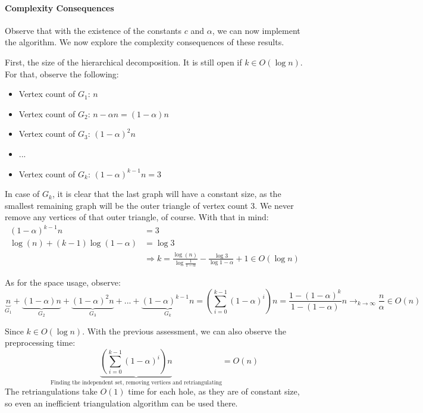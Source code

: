 \documentclass[10pt,fleqn]{article}
\theoremstyle{definition}
\theoremstyle{remark}
\begin{document}
\paragraph{Complexity Consequences}

Observe that with the existence of the constants \(c\) and \(\alpha\), we can now implement the algorithm. We now explore the complexity consequences of these results.

First, the size of the hierarchical decomposition. It is still open if \(k \in O(\log{n})\). For that, observe the following:
\begin{itemize}
    \item Vertex count of \(G_1\): \(n\)
    \item Vertex count of \(G_2\): \(n - \alpha n = (1-\alpha) n\)
    \item Vertex count of \(G_3\): \((1-\alpha)^2 n\)
    \item ...
    \item Vertex count of \(G_k\): \((1-\alpha)^{k-1} n = 3\)
\end{itemize}
In case of \(G_k\), it is clear that the last graph will have a constant size, as the smallest remaining graph will be the outer triangle of vertex count 3. We never remove any vertices of that outer triangle, of course. With that in mind:
\begin{align*}
    (1-\alpha)^{k-1} n &= 3\\
    \log(n) + (k-1)\log(1-\alpha) &= \log{3}\\
    &\Rightarrow k =  \frac{\log(n)}{\log{\frac{1}{1-\alpha}}} - \frac{\log{3}}{\log{1-\alpha}} + 1 \in O(\log{n})
\end{align*}

As for the space usage, observe:
\[
    \underbrace{n}_{G_1} + \underbrace{(1-\alpha) n}_{G_2} + \underbrace{(1-\alpha)^2 n}_{G_3} + ... + \underbrace{(1-\alpha)^{k-1} n}_{G_k} = \left(\sum_{i=0}^{k-1} (1-\alpha)^i\right) n = \frac{1-(1-\alpha)^{k}}{1-(1-\alpha)} n \longrightarrow_{k\to\infty} \frac{n}{\alpha} \in O(n)
\]

Since \(k \in O(\log{n})\). With the previous assessment, we can also observe the preprocessing time:
\[
    \underbrace{\left(\sum_{i=0}^{k-1} (1-\alpha)^i\right) n}_{\text{Finding the independent set, removing vertices and retriangulating}} = O(n)
\]
The retriangulations take \(O(1)\) time for each hole, as they are of constant size, so even an inefficient triangulation algorithm can be used there.
\end{document}

